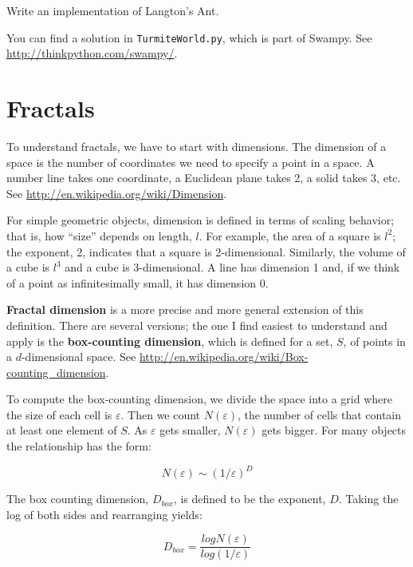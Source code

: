\documentclass[10pt]{book}
\begin{document}
\begin{ex}

Write an implementation of Langton's Ant.

You can find a solution in {\tt TurmiteWorld.py}, which is
part of Swampy.  See \url{http://thinkpython.com/swampy/}.

\end{ex}




\chapter{Fractals}

To understand fractals, we have to start with dimensions.  The
dimension of a space is the number of coordinates we need to specify a
point in a space.  A number line takes one coordinate, a Euclidean
plane takes 2, a solid takes 3, etc.  See
\url{http://en.wikipedia.org/wiki/Dimension}.

For simple geometric objects, dimension is defined in terms of scaling
behavior; that is, how ``size'' depends on length, $l$.  For example,
the area of a square is $l^2$; the exponent, 2, indicates that a
square is 2-dimensional.  Similarly, the volume of a cube is $l^3$ and
a cube is 3-dimensional.  A line has dimension 1 and, if we think of a
point as infinitesimally small, it has dimension 0.

{\bf Fractal dimension} is a more precise and more general extension
of this definition.  There are several versions; the one I find
easiest to understand and apply is the {\bf box-counting dimension},
which is defined for a set, $S$, of points in a $d$-dimensional
space.  See \url{http://en.wikipedia.org/wiki/Box-counting_dimension}.

\newcommand{\veps}{\varepsilon}

To compute the box-counting dimension, we divide the space into a grid
where the size of each cell is $\veps$.  Then we count $N(\veps)$,
the number of cells that contain at least one element of $S$.  As
$\veps$ gets smaller, $N(\veps)$ gets bigger.  For many objects
the relationship has the form:

\[ N(\veps) \sim \left( 1 / \veps \right)^D \]

The box counting dimension, $D_{box}$, is defined to be the exponent, $D$.
Taking the log of both sides and rearranging yields:

\[ D_{box} = \frac{log N(\veps)}{log \left( 1 / \veps \right)} \]
\end{document}
